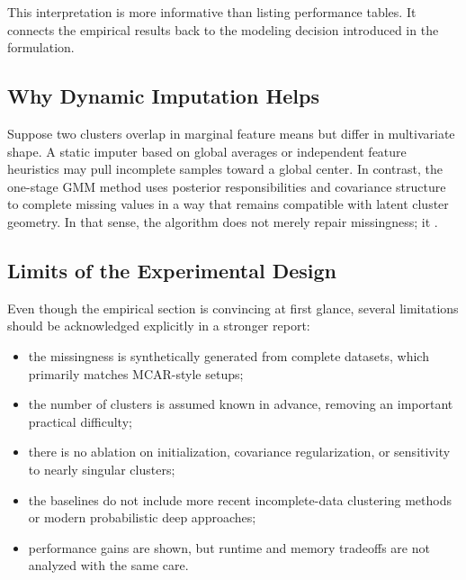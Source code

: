 This interpretation is more informative than listing performance tables. It connects the empirical results back to the modeling decision introduced in the formulation.

\subsection{Why Dynamic Imputation Helps}
Suppose two clusters overlap in marginal feature means but differ in multivariate shape. A static imputer based on global averages or independent feature heuristics may pull incomplete samples toward a global center. In contrast, the one-stage GMM method uses posterior responsibilities and covariance structure to complete missing values in a way that remains compatible with latent cluster geometry. In that sense, the algorithm does not merely repair missingness; it .

\subsection{Limits of the Experimental Design}
Even though the empirical section is convincing at first glance, several limitations should be acknowledged explicitly in a stronger report:
\begin{itemize}
    \item the missingness is synthetically generated from complete datasets, which primarily matches MCAR-style setups;
    \item the number of clusters is assumed known in advance, removing an important practical difficulty;
    \item there is no ablation on initialization, covariance regularization, or sensitivity to nearly singular clusters;
    \item the baselines do not include more recent incomplete-data clustering methods or modern probabilistic deep approaches;
    \item performance gains are shown, but runtime and memory tradeoffs are not analyzed with the same care.
\end{itemize}

